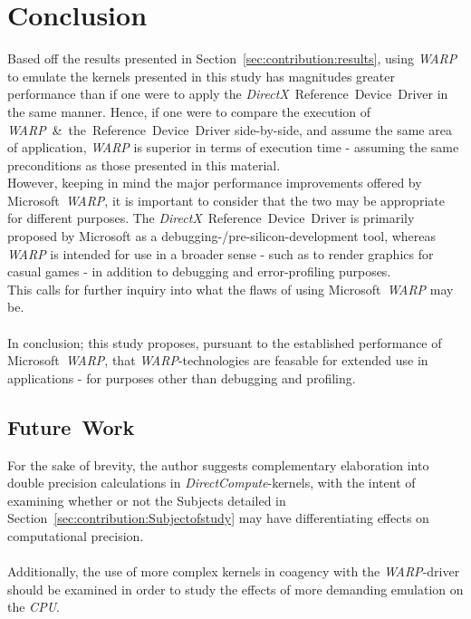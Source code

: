 \documentclass[fleqn,10pt]{SelfArx} %
\begin{document}
\section{Conclusion}
\label{sec:conclusion}
Based off the results presented in Section~\ref{sec:contribution:results}, using \textit{WARP} to emulate the kernels presented in this study has magnitudes greater performance than if one were to apply the \textit{DirectX}~Reference~Device~Driver in the same manner. Hence, if one were to compare the execution of \textit{WARP}~\&~the~Reference~Device~Driver side-by-side, and assume the same area of application, \textit{WARP} is superior in terms of execution time - assuming the same preconditions as those presented in this material.\\
However, keeping in mind the major performance improvements offered by Microsoft~\textit{WARP}, it is important to consider that the two may be appropriate for different purposes. The \textit{DirectX}~Reference~Device~Driver is primarily proposed by Microsoft as a debugging-/pre-silicon-development tool, whereas \textit{WARP} is intended for use in a broader sense - such as to render graphics for casual games - in addition to debugging and error-profiling purposes.\\
This calls for further inquiry into what the flaws of using Microsoft~\textit{WARP} may be.\\
\\
In conclusion; this study proposes, pursuant to the established performance of Microsoft~\textit{WARP}, that \textit{WARP}-technologies are feasable for extended use in applications - for purposes other than debugging and profiling. 




\subsection{Future~Work}
\label{sec:conclusion:futurework}
For the sake of brevity, the author suggests complementary elaboration into double precision calculations in \textit{DirectCompute}-kernels, with the intent of examining whether or not the Subjects detailed in Section~\ref{sec:contribution:Subjectofstudy} may have differentiating effects on computational precision.\\
\\
Additionally, the use of more complex kernels  in coagency with the \textit{WARP}-driver should be examined in order to study the effects of more demanding emulation on the \textit{CPU}.
\end{document}
